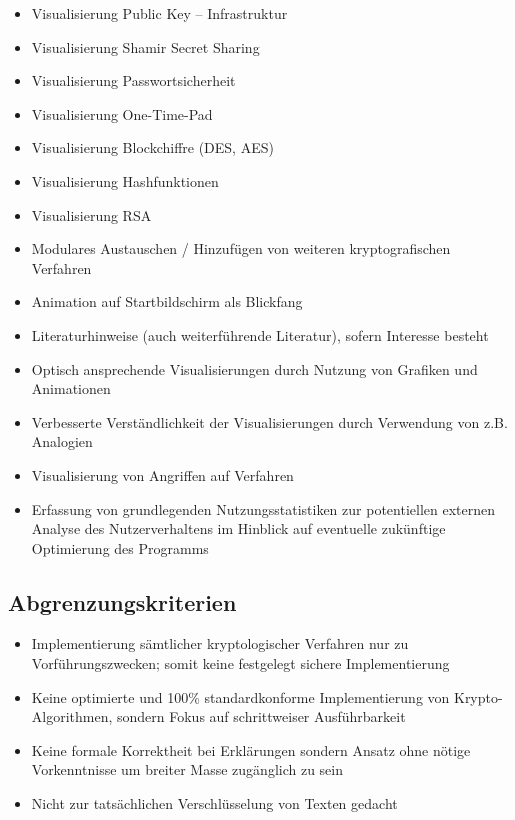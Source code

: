 \documentclass{article}
\begin{document}
\begin{itemize}
    \item Visualisierung Public Key – Infrastruktur
    \item Visualisierung Shamir Secret Sharing
    \item Visualisierung Passwortsicherheit
    \item Visualisierung One-Time-Pad
    \item Visualisierung Blockchiffre (DES, AES)
    \item Visualisierung Hashfunktionen
    \item Visualisierung RSA
    \item Modulares Austauschen / Hinzufügen von weiteren kryptografischen Verfahren
    \item Animation auf Startbildschirm als Blickfang
    \item Literaturhinweise (auch weiterführende Literatur), sofern Interesse besteht
    \item Optisch ansprechende Visualisierungen durch Nutzung von Grafiken und Animationen
    \item Verbesserte Verständlichkeit der Visualisierungen durch Verwendung von z.B. Analogien
    \item Visualisierung von Angriffen auf Verfahren
    \item Erfassung von grundlegenden Nutzungsstatistiken zur potentiellen externen Analyse des Nutzerverhaltens  im Hinblick auf eventuelle zukünftige Optimierung des Programms
\end{itemize}

\subsection{Abgrenzungskriterien}
\begin{itemize}
	\item Implementierung sämtlicher kryptologischer Verfahren nur zu Vorführungszwecken; somit keine festgelegt sichere Implementierung
    \item Keine optimierte und 100\% standardkonforme Implementierung von Krypto-Algorithmen,
        sondern Fokus auf schrittweiser Ausführbarkeit
    \item Keine formale Korrektheit bei Erklärungen sondern Ansatz ohne nötige Vorkenntnisse
        um breiter Masse zugänglich zu sein
    \item Nicht zur tatsächlichen Verschlüsselung von Texten gedacht
\end{itemize}
\end{document}

